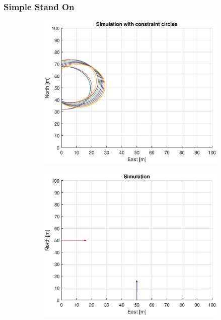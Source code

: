 \subsubsection{Simple Stand On}
\begin{figure}[!b] %
    \begin{subfigure}[b]{0.49\textwidth}
        \centering
        \includegraphics[width=\textwidth]{Images/Figures/Enkel_SO/Simple0_f1_Frame1}
    \end{subfigure}
    \hfill
    \begin{subfigure}[b]{0.499\textwidth}
        \centering
        \includegraphics[width=\textwidth]{Images/Figures/Enkel_SO/Simple0_f600_Frame1}

\end{subfigure}
\end{figure}
